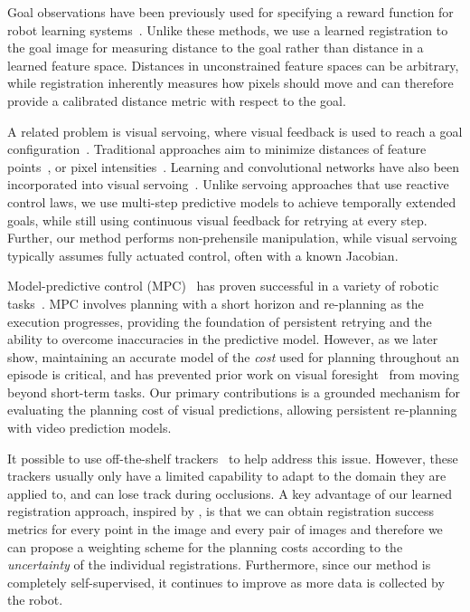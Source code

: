 Goal observations have been previously used for specifying a reward function for robot learning systems~\cite{jagersand1995visual,deguchi1999image,e2c,dsae}. Unlike these methods, we use a learned registration to the goal image for measuring distance to the goal rather than distance in a learned feature space. Distances in unconstrained feature spaces can be arbitrary, while registration inherently measures how pixels should move and can therefore provide a calibrated distance metric with respect to the goal. 

A related problem is visual servoing, where visual feedback is used to reach a goal configuration~\cite{hutchinson1996tutorial,kragic2002survey,desouza2002survey}.
Traditional approaches aim to minimize distances of feature points~\cite{feddema1989vision,espiau1992servo,wilson1996relative}, or pixel intensities~\cite{caron2013photometric}. Learning and convolutional networks have also been incorporated into visual servoing~\cite{saxena2017servoing,bateux2018servoing,lee2017servoing,google_handeye}. Unlike servoing approaches that use reactive control laws, we use multi-step predictive models to achieve temporally extended goals, while still using continuous visual feedback for retrying at every step. Further, our method performs non-prehensile manipulation, while visual servoing typically assumes fully actuated control, often with a known Jacobian.

Model-predictive control (MPC)~\cite{camacho2013model} has proven successful in a variety of robotic tasks~\cite{shim2003decentralized,allibert2010predictive,howard2010receding,williams2017information,deep_mpc}.
MPC involves planning with a short horizon and re-planning as the execution progresses, providing the foundation of persistent retrying and the ability to overcome inaccuracies in the predictive model. However, as we later show, maintaining an accurate model of the \emph{cost} used for planning throughout an episode is critical, and has prevented prior work on visual foresight~\cite{foresight,sna} from moving beyond short-term tasks.
Our primary contributions is a grounded mechanism for evaluating the planning cost of visual predictions, allowing persistent re-planning with video prediction models.

It possible to use off-the-shelf trackers~\cite{lucas1981iterative,brox2004high,babenko2009visual,mei2009robust} to help address this issue. However, these trackers usually only have a limited capability to adapt to the domain they are applied to, and can lose track during occlusions. A key advantage of our learned registration approach, inspired by \cite{meister2017unflow}, is that we can obtain registration success metrics for every point in the image and every pair of images and therefore we can propose a weighting scheme for the planning costs according to the \emph{uncertainty} of the individual registrations. Furthermore, since our method is completely self-supervised, it continues to improve as more data is collected by the robot.
